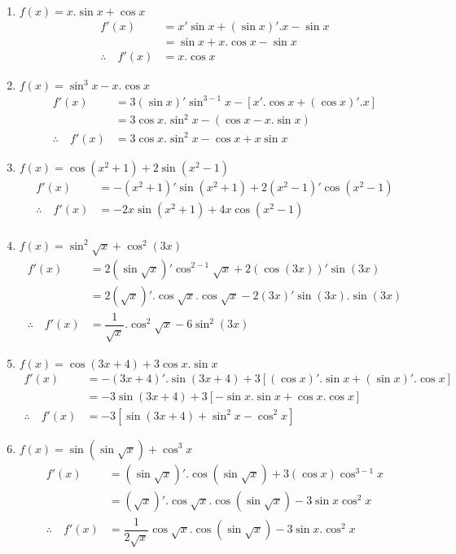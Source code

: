 \documentclass[a4paper,12pt]{article}
\begin{document}
\answer
\begin{enumerate}
	\item $f(x)=x.\sin x+\cos x$
	      \begin{align*}
		      f'(x)                  & =x'\sin x+(\sin x)'. x-\sin x \\
		                             & =\sin x+x.\cos x-\sin x       \\
		      \therefore \quad f'(x) & =x.\cos x
	      \end{align*}
	\item $f(x)=\sin^3 x-x.\cos x$
	      \begin{align*}
		      f'(x)                  & =3(\sin x)'\sin^{3-1}x-[x'.\cos x+(\cos x)'.x] \\
		                             & =3\cos x. \sin^2 x-(\cos x-x.\sin x)           \\
		      \therefore \quad f'(x) & =3\cos x.\sin^2 x-\cos x +x\sin x
	      \end{align*}
	\item $f(x)=\cos (x^2+1)+2\sin (x^2-1)$
	      \begin{align*}
		      f'(x)                  & =-(x^2+1)'\sin (x^2+1)+2(x^2-1)'\cos (x^2-1) \\
		      \therefore \quad f'(x) & =-2x\sin (x^2+1)+4x\cos (x^2-1)              \\
	      \end{align*}
	\item $f(x)=\sin^2\sqrt{x}+\cos^2 (3x)$
	      \begin{align*}
		      f'(x)                  & =2(\sin \sqrt{x})'\cos^{2-1} \sqrt{x}+2(\cos (3x))' \sin (3x)       \\
		                             & =2(\sqrt{x})'.\cos \sqrt{x}.\cos \sqrt{x}-2(3x)'\sin (3x).\sin (3x) \\
		      \therefore \quad f'(x) & =\dfrac{1}{\sqrt{x}}.\cos^2 \sqrt{x}-6\sin^2 (3x)
	      \end{align*}
	\item $f(x)=\cos (3x+4)+3\cos x.\sin x$
	      \begin{align*}
		      f'(x)                  & =-(3x+4)'.\sin (3x+4)+3[(\cos x)'.\sin x+(\sin x)'.\cos x] \\
		                             & =-3\sin (3x+4)+3[-\sin x.\sin x+\cos x.\cos x]             \\
		      \therefore \quad f'(x) & =-3[\sin (3x+4)+\sin^2x -\cos^2 x]
	      \end{align*}
	\item $f(x)=\sin (\sin \sqrt{x})+\cos^3 x$
	      \begin{align*}
		      f'(x)                  & =(\sin \sqrt{x})'.\cos (\sin \sqrt{x})+3(\cos x)\cos^{3-1}x              \\
		                             & =(\sqrt{x})'.\cos \sqrt{x}.\cos(\sin \sqrt{x})-3\sin x\cos ^2 x          \\
		      \therefore \quad f'(x) & =\dfrac{1}{2\sqrt{x}}\cos \sqrt{x}.\cos (\sin \sqrt{x})-3\sin x.\cos^2 x
	      \end{align*}
\end{enumerate}
\end{document}
